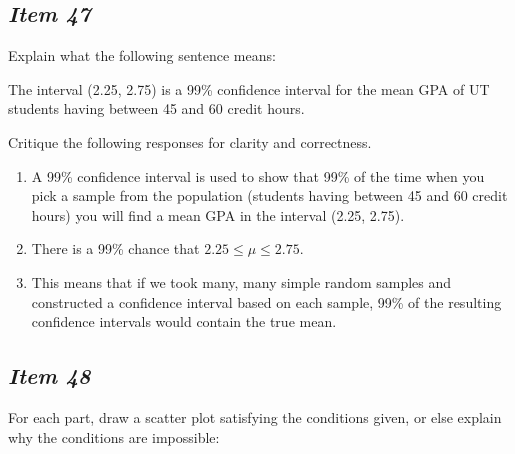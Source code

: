 \subsection{\textbf{\textit{Item 47}}}





Explain what the following sentence means:





The interval (2.25, 2.75) is a 99\% confidence interval for the mean GPA of UT students having between 45 and 60 credit hours.





Critique the following responses for clarity and correctness.





\begin{enumerate} [leftmargin=1cm, itemsep=.2em]


\item A 99\% confidence interval is used to show that 99\% of the time when you pick a sample from the population (students having between 45 and 60 credit hours) you will find a mean GPA in the interval (2.25, 2.75).





\item 


There is a 99\% chance that $2.25 \leq \mu \leq 2.75$.





\item This means that if we took many, many simple random samples and constructed a confidence interval based on each sample, 99\% of the resulting confidence intervals would contain the true mean.


\end{enumerate}





\subsection{\textbf{\textit{Item 48}}}


For each part, draw a scatter plot satisfying the conditions given, or else explain why the conditions are impossible:


